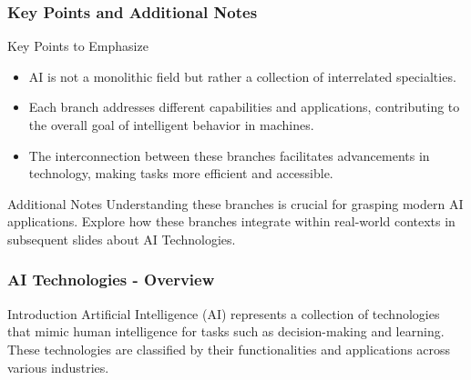 \documentclass{beamer}
\begin{document}
\begin{frame}[fragile]
    \frametitle{Key Points and Additional Notes}
    \begin{block}{Key Points to Emphasize}
        \begin{itemize}
            \item AI is not a monolithic field but rather a collection of interrelated specialties.
            \item Each branch addresses different capabilities and applications, contributing to the overall goal of intelligent behavior in machines.
            \item The interconnection between these branches facilitates advancements in technology, making tasks more efficient and accessible.
        \end{itemize}
    \end{block}

    \begin{block}{Additional Notes}
        Understanding these branches is crucial for grasping modern AI applications. Explore how these branches integrate within real-world contexts in subsequent slides about AI Technologies.
    \end{block}
\end{frame}

\begin{frame}[fragile]
    \frametitle{AI Technologies - Overview}
    \begin{block}{Introduction}
        Artificial Intelligence (AI) represents a collection of technologies that mimic human intelligence for tasks such as decision-making and learning. These technologies are classified by their functionalities and applications across various industries.
    \end{block}
\end{frame}
\end{document}
